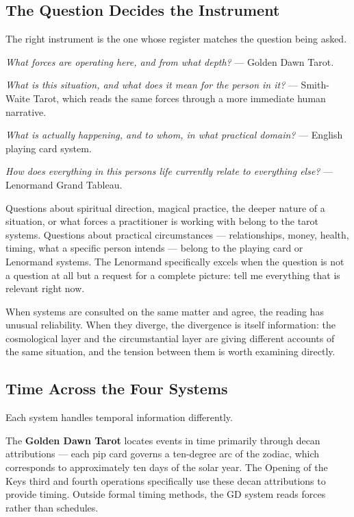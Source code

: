 \subsection{The Question Decides the Instrument}\label{the-question-decides-the-instrument}

The right instrument is the one whose register matches the question being asked.

\emph{What forces are operating here, and from what depth?} --- Golden Dawn Tarot.

\emph{What is this situation, and what does it mean for the person in it?} --- Smith-Waite Tarot, which reads the same forces through a more immediate human narrative.

\emph{What is actually happening, and to whom, in what practical domain?} --- English playing card system.

\emph{How does everything in this person\textquotesingle s life currently relate to everything else?} --- Lenormand Grand Tableau.

Questions about spiritual direction, magical practice, the deeper nature of a situation, or what forces a practitioner is working with belong to the tarot systems. Questions about practical circumstances --- relationships, money, health, timing, what a specific person intends --- belong to the playing card or Lenormand systems. The Lenormand specifically excels when the question is not a question at all but a request for a complete picture: tell me everything that is relevant right now.

When systems are consulted on the same matter and agree, the reading has unusual reliability. When they diverge, the divergence is itself information: the cosmological layer and the circumstantial layer are giving different accounts of the same situation, and the tension between them is worth examining directly.

\subsection{Time Across the Four Systems}\label{time-across-the-four-systems}

Each system handles temporal information differently.

The \textbf{Golden Dawn Tarot} locates events in time primarily through decan attributions --- each pip card governs a ten-degree arc of the zodiac, which corresponds to approximately ten days of the solar year. The Opening of the Key\textquotesingle s third and fourth operations specifically use these decan attributions to provide timing. Outside formal timing methods, the GD system reads forces rather than schedules.

